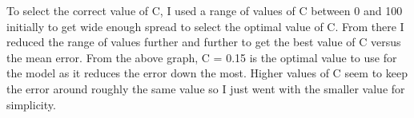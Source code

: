 \documentclass[11pt]{article} %
\begin{document}
\begin{figure}[h]
\centering
{}
\qquad
{}
\qquad
{}
\qquad
{}
\end{figure}
To select the correct value of C, I used a range of values of C between 0 and 100 initially to get wide enough spread to select the optimal value of C. From there I reduced the range of values further and further to get the best value of C versus the mean error. From the above graph, C = 0.15 is the optimal value to use for the model as it reduces the error down the most. Higher values of C seem to keep the error around roughly the same value so I just went with the smaller value for simplicity. 
\end{document}
